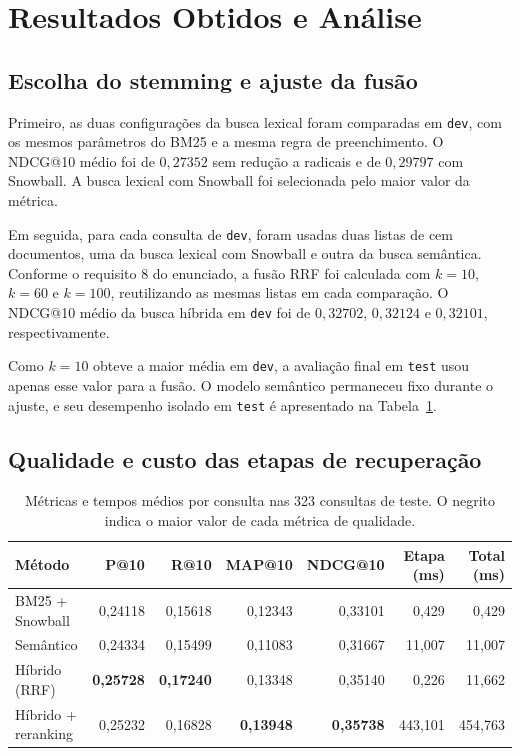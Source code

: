 \documentclass[12pt]{article}
\begin{document}
\section{Resultados Obtidos e Análise}
\label{sec:resultados}

\subsection{Escolha do stemming e ajuste da fusão}

Primeiro, as duas configurações da busca lexical foram comparadas em
\texttt{dev}, com os mesmos parâmetros do BM25 e a mesma regra de
preenchimento. O NDCG@10 médio foi de \(0{,}27352\) sem redução a radicais
e de \(0{,}29797\) com Snowball. A busca lexical com Snowball foi
selecionada pelo maior valor da métrica.

Em seguida, para cada consulta de \texttt{dev}, foram usadas duas listas
de cem documentos, uma da busca lexical com Snowball e outra da busca
semântica. Conforme o requisito 8 do enunciado, a fusão RRF foi calculada
com \(k=10\), \(k=60\) e \(k=100\), reutilizando as mesmas listas em cada
comparação. O NDCG@10 médio da busca híbrida em \texttt{dev} foi de
\(0{,}32702\), \(0{,}32124\) e \(0{,}32101\),
respectivamente.

Como \(k=10\) obteve a maior média em \texttt{dev}, a avaliação final em
\texttt{test} usou apenas esse valor para a fusão. O modelo semântico
permaneceu fixo durante o ajuste, e seu desempenho isolado em
\texttt{test} é apresentado na Tabela~\ref{tab:metricas-rec}.

\subsection{Qualidade e custo das etapas de recuperação}

\begin{table}[htbp]
\centering
\small
\caption{Métricas e tempos médios por consulta nas 323 consultas de teste.
O negrito indica o maior valor de cada métrica de qualidade.}
\label{tab:metricas-rec}
\begin{tabular}{@{}lrrrrrr@{}}
\toprule
Método & P@10 & R@10 & MAP@10 & NDCG@10 & Etapa (ms) & Total (ms) \\
\midrule
BM25 + Snowball        & 0,24118 & 0,15618 & 0,12343 & 0,33101 & 0,429 & 0,429 \\
Semântico              & 0,24334 & 0,15499 & 0,11083 & 0,31667 & 11,007 & 11,007 \\
Híbrido (RRF)          & \textbf{0,25728} & \textbf{0,17240} & 0,13348 & 0,35140 & 0,226 & 11,662 \\
Híbrido + reranking    & 0,25232 & 0,16828 & \textbf{0,13948} & \textbf{0,35738} & 443,101 & 454,763 \\
\bottomrule
\end{tabular}
\end{table}
\end{document}
